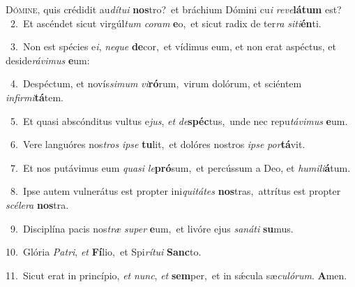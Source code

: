 \lettrine{\initial\textcolor{\initialcolor}{D}}{ómine,} quis crédidit au\-\textit{dí}\-\textit{tu}\textit{i} \textbf{nos}\-tro?~\star et bráchium Dómini cu\textit{i} \textit{re}\-\textit{ve}\textbf{lá}\textbf{tum} est?\\
{\numbfont\textcolor{\numbcolor}{~2.}}~Et ascéndet sicut virgúl\textit{tum} \textit{co}\-\textit{ram} \textbf{e}\-o,~\star et sicut radix de ter\textit{ra} \textit{si}\-\textit{ti}\textbf{én}ti.\par
{\numbfont\textcolor{\numbcolor}{~3.}}~Non est spécies e\-\textit{i}\-, \textit{ne}\-\textit{que} \textbf{de}\-cor,~\star et vídimus eum, et non erat aspéctus, et deside\-\textit{rá}\-\textit{vi}\textit{mus} \textbf{e}\-um:\par
{\numbfont\textcolor{\numbcolor}{~4.}}~Despéctum, et novís\-\textit{si}\-\textit{mum} \textit{vi}\-\textbf{ró}rum,~\star virum dolórum, et sciéntem \textit{in}\-\textit{fir}\textit{mi}\textbf{tá}tem.\par
{\numbfont\textcolor{\numbcolor}{~5.}}~Et quasi abscónditus vultus e\-\textit{jus}\-, \textit{et} \textit{de}\-\textbf{spéc}tus,~\star unde nec repu\-\textit{tá}\-\textit{vi}\textit{mus} \textbf{e}\-um.\par
{\numbfont\textcolor{\numbcolor}{~6.}}~Vere languóres nos\textit{tros} \textit{ip}\-\textit{se} \textbf{tu}\-lit,~\star et dolóres nostros \textit{ip}\-\textit{se} \textit{por}\-\textbf{tá}vit.\par
{\numbfont\textcolor{\numbcolor}{~7.}}~Et nos putávimus eum \textit{qua}\-\textit{si} \textit{le}\-\textbf{pró}sum,~\star et percússum a Deo, et \textit{hu}\-\textit{mi}\textit{li}\textbf{á}tum.\par
{\numbfont\textcolor{\numbcolor}{~8.}}~Ipse autem vulnerátus est propter ini\-\textit{qui}\-\textit{tá}\textit{tes} \textbf{nos}\-tras,~\star attrítus est propter \textit{scé}\-\textit{le}\textit{ra} \textbf{nos}\-tra.\par
{\numbfont\textcolor{\numbcolor}{~9.}}~Disciplína pacis nos\textit{træ} \textit{su}\-\textit{per} \textbf{e}\-um,~\star et livóre ejus \textit{sa}\-\textit{ná}\textit{ti} \textbf{su}\-mus.\par
{\numbfont\textcolor{\numbcolor}{10.}}~Glória \textit{Pa}\-\textit{tri}, \textit{et} \textbf{Fí}\-lio,~\star et Spi\-\textit{rí}\-\textit{tu}\textit{i} \textbf{Sanc}\-to.\par
{\numbfont\textcolor{\numbcolor}{11.}}~Sicut erat in princípio, \textit{et} \textit{nunc}\-, \textit{et} \textbf{sem}\-per,~\star et in sǽcula sæ\-\textit{cu}\-\textit{ló}\textit{rum}. \textbf{A}\-men.\par

